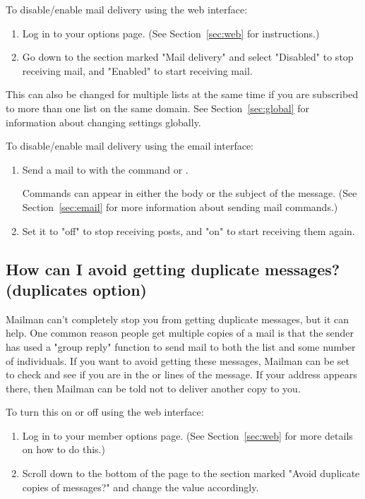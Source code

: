 \documentclass{howto}
\begin{document}
To disable/enable mail delivery using the web interface:
\begin{enumerate}
	\item Log in to your options page. (See Section~\ref{sec:web} for instructions.)
	\item Go down to the section marked "Mail delivery" and select "Disabled"
		to stop receiving mail, and "Enabled" to start receiving mail.
\end{enumerate}

This can also be changed for multiple lists at the same time if you are subscribed to 
more than one list on the same domain.  See Section~\ref{sec:global} for 
information about changing settings globally.

To disable/enable mail delivery using the email interface:
\begin{enumerate}
   \item Send a mail to  with the command
    or .

   Commands can appear
   in either the body or the subject of the message.  (See
   Section~\ref{sec:email} for more information about sending mail
   commands.) 
	\item Set it to "off" to stop receiving posts, and "on" to start
	receiving them again.
\end{enumerate}

\subsection{How can I avoid getting duplicate messages? (duplicates option)
\label{sec:nodupes}}

Mailman can't completely stop you from getting duplicate messages, but it 
can help.  One common reason people get multiple copies of a mail is that 
the sender has used a "group reply" function to send mail to both the list and 
some number of individuals.  If you want to avoid getting these messages,
Mailman can be set to check and see if you are in the  or
 lines of the message.  If your address appears there,
then Mailman can be told not to deliver another copy to you.

To turn this on or off using the web interface:
\begin{enumerate}
	\item Log in to your member options page.  (See Section~\ref{sec:web} 
	for more details on how to do this.)
	\item Scroll down to the bottom of the page to the section marked
	"Avoid duplicate copies of messages?" and change the value accordingly.
\end{enumerate}
\end{document}
